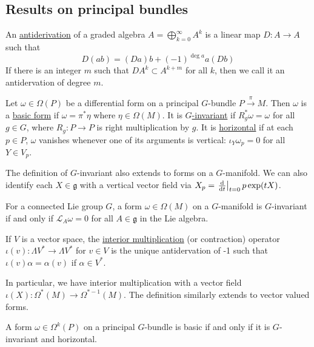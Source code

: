\subsection{Results on principal bundles}
\begin{defn} \label{defn:antiderivation}%
	An \underline{antiderivation} of a graded algebra $A=\bigoplus_{k=0}^\infty
	A^k$ is a linear map $D : A\to A$ such that 
	\[ 
	D(ab) = (Da)b + (-1)^{\deg a} a(Db)
	\] 
	If there is an integer $m$ such that  $D A^k \subset A^{k+m}$ for all $k$,
	then we call it an antidervation of degree  $m$.
\end{defn}
\begin{defn} 
	Let  $\omega\in \Omega(P)$ be a differential form on a principal $G$-bundle
	$P\xrightarrow{\pi} M$. 
	Then $\omega$ is a \underline{basic form} if  $\omega = \pi^*\eta$
	where  $\eta\in\Omega(M)$. 
	It is \underline{$G$-invariant} if $R^*_g \omega =\omega$ for all  $g\in G$,
	where $R_g : P\to P$ is right multiplication by  $g$.
	It is \underline{horizontal} if at each $p\in P$,
    $\omega$ vanishes whenever one of its arguments is vertical:
	$\iota_Y\omega_p = 0$ for all  $Y\in V_p$.
\end{defn}
\noindent
The definition of $G$-invariant also extends to forms on a  $G$-manifold. 
We can also identify each $X\in \mathfrak{g}$ with 
a vertical vector field via $X_p = \odv{}{t}_{t=0} p \exp (t X)$. 
\begin{thm} %
	\label{thm:lie_invariant}
	For a connected Lie group $G$, a form $\omega\in \Omega(M)$ on a 
	 $G$-manifold is  $G$-invariant if and only if  $\mathcal{L}_A\omega=0$ for
	 all $A\in\mathfrak{g}$ in the Lie algebra.
\end{thm}
\begin{defn} \label{def:contraction} %
	If $V$ is a vector space, the \underline{interior multiplication} (or 
	contraction) operator $\iota(v) :
	\Lambda V^* \to \Lambda V^*$ for $v\in V$ is the unique antidervation of -1 
	such that $\iota(v)\alpha = \alpha(v)$ if  $\alpha\in V^*$.
\end{defn}
\noindent
In particular, we have interior multiplication with a vector
field $\iota(X) : \Omega^*(M) \to \Omega^{*-1}(M)$.
The definition similarly extends to vector valued forms.

\begin{thm} %
	A form  $\omega\in\Omega^k(P)$ on a principal $G$-bundle is 
	basic if and only if it is $G$-invariant and horizontal.
\end{thm}

